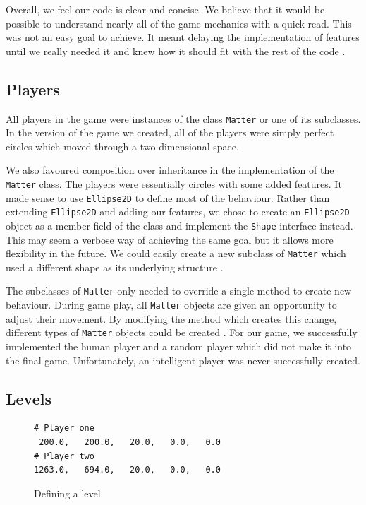 Overall, we feel our code is clear and concise. We believe that it
would be possible to understand nearly all of the game mechanics with
a quick read. This was not an easy goal to achieve. It meant delaying
the implementation of features until we really needed it and knew how
it should fit with the rest of the code \cite{jeffries1997}.


\subsection{Players}

All players in the game were instances of the class \texttt{Matter} or
one of its subclasses. In the version of the game we created, all of
the players were simply perfect circles which moved through a
two-dimensional space.

We also favoured composition over inheritance in the implementation of
the \texttt{Matter} class. The players were essentially circles with
some added features. It made sense to use \texttt{Ellipse2D} to define
most of the behaviour. Rather than extending \texttt{Ellipse2D} and
adding our features, we chose to create an \texttt{Ellipse2D} object
as a member field of the class and implement the \texttt{Shape}
interface instead. This may seem a verbose way of achieving the same
goal but it allows more flexibility in the future. We could easily
create a new subclass of \texttt{Matter} which used a different shape
as its underlying structure \cite{bloch2008}.

The subclasses of \texttt{Matter} only needed to override a single
method to create new behaviour. During game play, all \texttt{Matter}
objects are given an opportunity to adjust their movement. By
modifying the method which creates this change, different types of
\texttt{Matter} objects could be created \cite{bloch2008}. For our
game, we successfully implemented the human player and a random player
which did not make it into the final game. Unfortunately, an
intelligent player was never successfully created.

\subsection{Levels}
\begin{figure}
  \small{
\begin{verbatim}
# Player one
 200.0,   200.0,   20.0,   0.0,   0.0
# Player two
1263.0,   694.0,   20.0,   0.0,   0.0
\end{verbatim}
  }
  \caption{Defining a level}
  \label{fig:level}
\end{figure}

